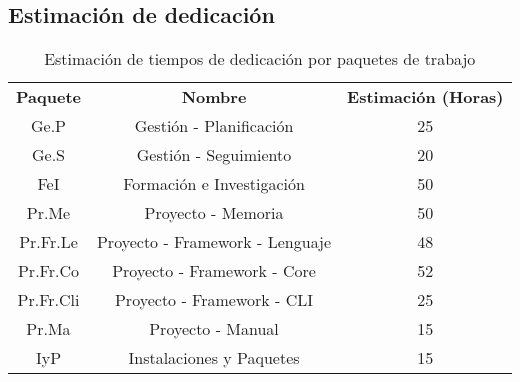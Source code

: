









\subsection{Estimación de dedicación}\label{subsec:tareas-estimacion}

\begin{table}[H]
    \centering
    \begin{tabular}{ccc}
    \textbf{Paquete} & \textbf{Nombre}                 & \textbf{Estimación (Horas)} \\
    Ge.P             & Gestión - Planificación         & 25                          \\
    Ge.S             & Gestión - Seguimiento           & 20                          \\
    FeI              & Formación e Investigación       & 50                          \\
    Pr.Me            & Proyecto - Memoria              & 50                          \\
    Pr.Fr.Le         & Proyecto - Framework - Lenguaje & 48                          \\
    Pr.Fr.Co         & Proyecto - Framework - Core     & 52                          \\
    Pr.Fr.Cli        & Proyecto - Framework - CLI      & 25                          \\
    Pr.Ma            & Proyecto - Manual               & 15                          \\
    IyP              & Instalaciones y Paquetes        & 15                          \\
    \end{tabular}
    \caption{Estimación de tiempos de dedicación por paquetes de trabajo}
    \label{tab:estimacion-paquetes}
\end{table}




